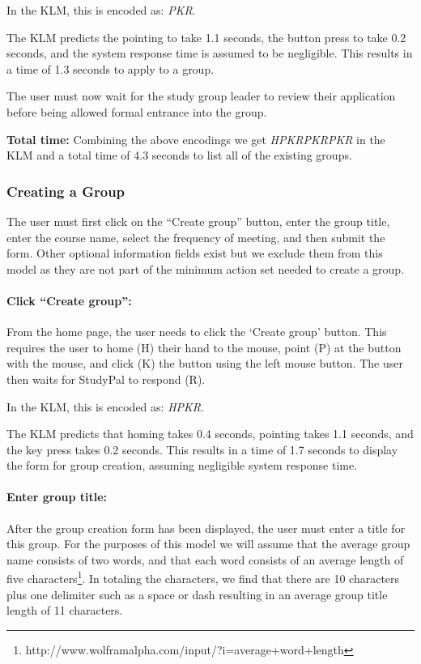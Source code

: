 \documentclass[conference]{IEEEtran}
\begin{document}
In the KLM, this is encoded as: \emph{PKR}.

The KLM predicts the pointing to take 1.1 seconds, the button press to take 0.2 seconds, and the system response time is assumed to be negligible.
This results in a time of 1.3 seconds to apply to a group.

The user must now wait for the study group leader to review their application before being allowed formal entrance into the group.

\textbf{Total time:}
Combining the above encodings we get \emph{HPKRPKRPKR} in the KLM and a total time of 4.3 seconds to list all of the existing groups.


\subsubsection{Creating a Group}
The user must first click on the ``Create group'' button, enter the group title, enter the course name, select the frequency of meeting, and then submit the form.
Other optional information fields exist but we exclude them from this model as they are not part of the minimum action set needed to create a group.

\paragraph{Click ``Create group'':}
From the home page, the user needs to click the `Create group' button.
This requires the user to home (H) their hand to the mouse, point (P) at the button with the mouse, and click (K) the button using the left mouse button.
The user then waits for StudyPal to respond (R).

In the KLM, this is encoded as: \emph{HPKR}.

The KLM predicts that homing takes 0.4 seconds, pointing takes 1.1 seconds, and the key press takes 0.2 seconds.
This results in a time of 1.7 seconds to display the form for group creation, assuming negligible system response time.

\paragraph{Enter group title:}
After the group creation form has been displayed, the user must enter a title for this group.
For the purposes of this model we will assume that the average group name consists of two words, and that each word consists of an average length of five characters\footnote{http://www.wolframalpha.com/input/?i=average+word+length}.
In totaling the characters, we find that there are 10 characters plus one delimiter such as a space or dash resulting in an average group title length of 11 characters.
\end{document}
